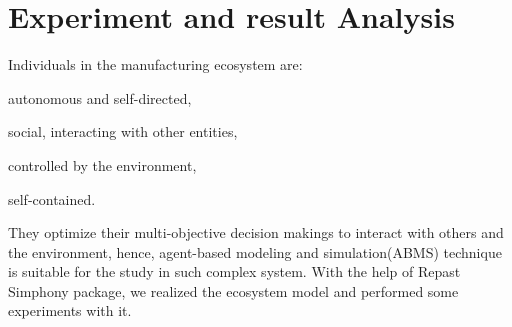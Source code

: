\section{Experiment and result Analysis} %
\label{sec:Experiment_results}

Individuals in the manufacturing ecosystem are: \begin{inparaenum}[1)]
\item autonomous and self-directed, 
\item social, interacting with other entities, 
\item controlled by the environment, 
\item self-contained.
\end{inparaenum} They optimize their multi-objective decision makings to interact with others and the environment, hence, agent-based modeling and simulation(ABMS) technique\cite{Macal2009,north2007managing} is suitable for the study in such complex system. With the help of Repast Simphony\cite{North2013} package, we realized the ecosystem model and performed some experiments with it.

%     
%     
%     
%     
%     
%     
%     
%     
% 
% 	


